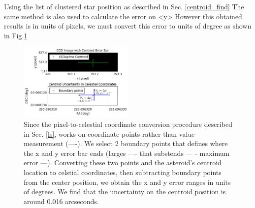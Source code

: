 \documentclass[authoryear, 12pt,5p, times]{elsarticle}
\begin{document}
Using the list of clustered star position as described in Sec. \ref{centroid_find}
The same method is also used to calculate the error on <y> 
However this obtained results is in units of pixels, we must convert this error to units of degree as shown in Fig.\ref{uncertainty_range} 
    	\begin{figure}[h!]
\includegraphics[width=0.5\textwidth]{figures/uncertainty_range}
\caption{ Since the pixel-to-celestial coordinate conversion procedure described in Sec. \ref{ls}, works on coordinate points rather than value measurement (----). We select 2 boundary points that defines where the x and y error bar ends (larges ---- that  substends --- - maximum error ---). Converting these two points and the asteroid's centroid location to celstial coordinates, then subtracting boundary points from the center position, we obtain the x and y error ranges in units of degrees. We find that the uncertainty on the centroid position is around 0.016 arcseconds. }
\label{uncertainty_range}
\end{figure}
\end{document}
